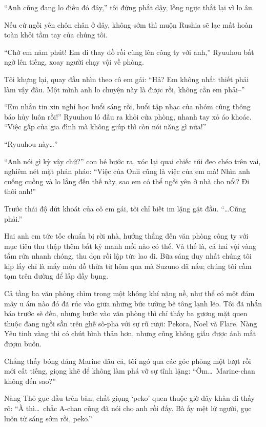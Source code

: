 \documentclass[../main.tex]{subfiles}
\begin{document}
``Anh cũng đang lo điều đó đây,'' tôi đứng phắt dậy, lồng ngực thắt lại vì lo âu.

Nếu cứ ngồi yên chôn chân ở đây, không sớm thì muộn Rushia sẽ lạc mất hoàn toàn khỏi tầm tay của chúng tôi.

``Chờ em năm phút! Em đi thay đồ rồi cùng lên công ty với anh,'' Ryuuhou bất ngờ lên tiếng, xoay người chạy vội về phòng.

Tôi khựng lại, quay đầu nhìn theo cô em gái: ``Hả? Em không nhất thiết phải làm vậy đâu. Một mình anh lo chuyện này là được rồi, không cần em phải--''

``Em nhắn tin xin nghỉ học buổi sáng rồi, buổi tập nhạc của nhóm cũng thông báo hủy luôn rồi!'' Ryuuhou ló đầu ra khỏi cửa phòng, nhanh tay xỏ áo khoác. ``Việc gấp của gia đình mà không giúp thì còn nói năng gì nữa!''

``Ryuuhou này\dots''

``Anh nói gì kỳ vậy chứ?'' con bé bước ra, xóc lại quai chiếc túi đeo chéo trên vai, nghiêm nét mặt phản pháo: ``Việc của Onii cũng là việc của em mà! Nhìn anh cuống cuồng và lo lắng đến thế này, sao em có thể ngồi yên ở nhà cho nổi? Đi thôi anh!''

Trước thái độ dứt khoát của cô em gái, tôi chỉ biết im lặng gật đầu. ``\dots Cũng phải.''

Hai anh em tức tốc chuẩn bị rời nhà, hướng thẳng đến văn phòng công ty với mục tiêu thu thập thêm bất kỳ manh mối nào có thể. Và thế là, cả hai vội vàng tắm rửa nhanh chóng, thu dọn rồi lập tức lao đi. Bữa sáng duy nhất chúng tôi kịp lấy chỉ là mấy món đồ thừa từ hôm qua mà Suzuno đã nấu; chúng tôi cầm tạm trên đường để lấp đầy bụng.

\ct

Cả tầng ba văn phòng chìm trong một không khí nặng nề, như thể có một đám mây u ám nào đó đã rúc vào giữa những bức tường bê tông lạnh lẽo. Tôi đã nhắn báo trước sẽ đến, nhưng bước vào văn phòng thì chỉ thấy ba gương mặt quen thuộc đang ngồi sẵn trên ghế sô-pha với sự rũ rượi: Pekora, Noel và Flare. Nàng Yêu tinh vàng thì có chút bình thản hơn, nhưng cũng không giấu được ánh mắt đượm buồn.

Chẳng thấy bóng dáng Marine đâu cả, tôi ngó qua các góc phòng một lượt rồi mới cất tiếng, giọng khẽ để không làm phá vỡ sự tĩnh lặng: ``Ờm\dots\ Marine-chan không đến sao?''

Nàng Thỏ gục đầu trên bàn, chất giọng `peko' quen thuộc giờ đây khàn đi thấy rõ: ``À thì\dots\ chắc A-chan cũng đã nói cho anh rồi đấy. Bà ấy mệt lử người, gục luôn từ sáng sớm rồi, peko.''
\end{document}
